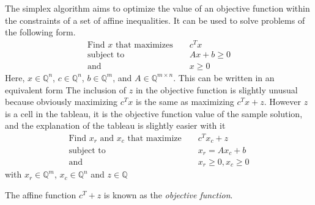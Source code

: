 \documentclass[11pt]{article} %
\begin{document}
The simplex algorithm aims to optimize the value of an objective function within the constraints of a set of affine inequalities. It can be used to solve problems of the following form.
\begin{equation}
  \begin{aligned}
    \text{Find } x \text{ that maximizes } && c^Tx \\
    \text{subject to } && A x + b \ge 0\\
    \text{and } && x \ge 0
  \end{aligned}
\end{equation}
Here, $x \in \mathbb{Q}^n$, $c \in \mathbb{Q}^n$, $b \in \mathbb{Q}^m$, and $A \in \mathbb{Q}^{m \times n}$.
This can be written in an equivalent form \color{red} The inclusion of $z$ in the objective function is slightly unusual because obviously maximizing $c^Tx$ is the same as maximizing $c^Tx + z$. However $z$ is a cell in the tableau, it is the objective function value of the sample solution, and the explanation of the tableau is slightly easier with it\color{black}
\begin{equation}
  \begin{aligned}
    \text{Find } x_r \text{ and } x_c \text{ that maximize } && c^Tx_c + z \\
    \text{subject to } && x_r = A x_c + b \\
    \text{and } && x_r \ge 0, x_c \ge 0
  \end{aligned}
\end{equation}
with $x_r \in \mathbb{Q}^m$, $x_c \in \mathbb{Q}^n$ and $z \in \mathbb{Q}$

The affine function $c^T+z$ is known as the \textit{objective function}.
\end{document}
